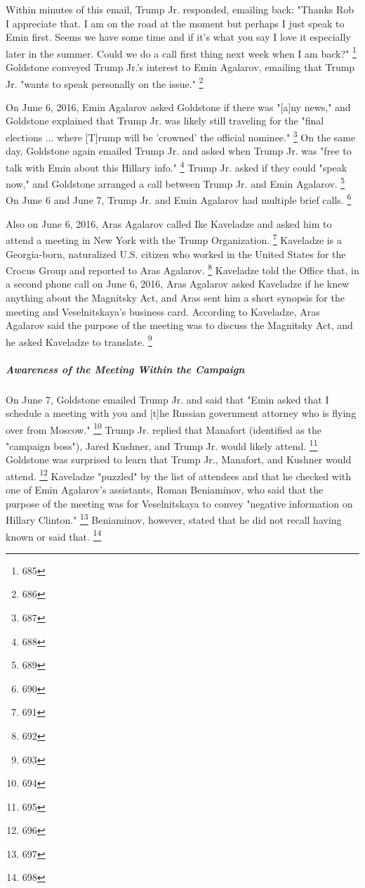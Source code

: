 Within minutes of this email, Trump Jr. responded, emailing back: "Thanks Rob I appreciate that.
I am on the road at the moment but perhaps I just speak to Emin first.
Seems we have some time and if it's what you say I love it especially later in the summer.
Could we do a call first thing next week when I am back?"%
\footnote{685}
Goldstone conveyed Trump Jr.'s interest to Emin Agalarov, emailing that Trump Jr. "wants to speak personally on the issue."%
\footnote{686}

On June 6, 2016, Emin Agalarov asked Goldstone if there was "[a]ny news," and Goldstone explained that Trump Jr. was likely still traveling for the "final elections ... where [T]rump will be 'crowned' the official nominee."%
\footnote{687}
On the same day, Goldstone again emailed Trump Jr. and asked when Trump Jr. was "free to talk with Emin about this Hillary info."%
\footnote{688}
Trump Jr. asked if they could "speak now," and Goldstone arranged a call between Trump Jr. and Emin Agalarov.%
\footnote{689}
On June 6 and June 7, Trump Jr. and Emin Agalarov had multiple brief calls.%
\footnote{690}

Also on June 6, 2016, Aras Agalarov called Ike Kaveladze and asked him to attend a meeting in New York with the Trump Organization.%
\footnote{691}
Kaveladze is a Georgia-born, naturalized U.S. citizen who worked in the United States for the Crocus Group and reported to Aras Agalarov.%
\footnote{692}
Kaveladze told the Office that, in a second phone call on June 6, 2016, Aras Agalarov asked Kaveladze if he knew anything about the Magnitsky Act, and Aras sent him a short synopsis for the meeting and Veselnitskaya's business card.
According to Kaveladze, Aras Agalarov said the purpose of the meeting was to discuss the Magnitsky Act, and he asked Kaveladze to translate.%
\footnote{693}

\subparagraph{Awareness of the Meeting Within the Campaign}

On June 7, Goldstone emailed Trump Jr. and said that "Emin asked that I schedule a meeting with you and [t]he Russian government attorney who is flying over from Moscow."%
\footnote{694}
Trump Jr. replied that Manafort (identified as the "campaign boss"), Jared Kushner, and Trump Jr. would likely attend.%
\footnote{695}
Goldstone was surprised to learn that Trump Jr., Manafort, and Kushner would attend.%
\footnote{696}
Kaveladze 
"puzzled" by the list of attendees and that he checked with one of Emin Agalarov's assistants, Roman Beniaminov, who said that the purpose of the meeting was for Veselnitskaya to convey "negative information on Hillary Clinton."%
\footnote{697}
Beniaminov, however, stated that he did not recall having known or said that.%
\footnote{698}


